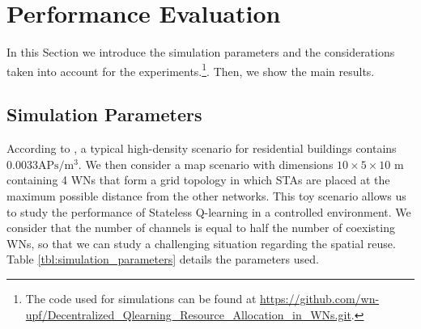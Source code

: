 \documentclass[conference]{IEEEtran}
\begin{document}
	\section{Performance Evaluation}
	\label{section:performance_evaluation}	
	In this Section we introduce the simulation parameters and the considerations taken into account for the experiments.\footnote{The code used for simulations can be found at \url{https://github.com/wn-upf/Decentralized_Qlearning_Resource_Allocation_in_WNs.git}.}. Then, we show the main results.

	\subsection{Simulation Parameters}
	\label{section:simulation_parameters}
	According to \cite{bellalta2016ax}, a typical high-density scenario for residential buildings contains $0.0033 \text{APs}/\text{m}^3$. We then consider a map scenario with dimensions $10\times5\times10$ m containing 4 WNs that form a grid topology in which STAs are placed at the maximum possible distance from the other networks. This toy scenario allows us to study the performance of Stateless Q-learning in a controlled environment. We consider that the number of channels is equal to half the number of coexisting WNs, so that we can study a challenging situation regarding the spatial reuse. Table \ref{tbl:simulation_parameters} details the parameters used.	
\end{document}
